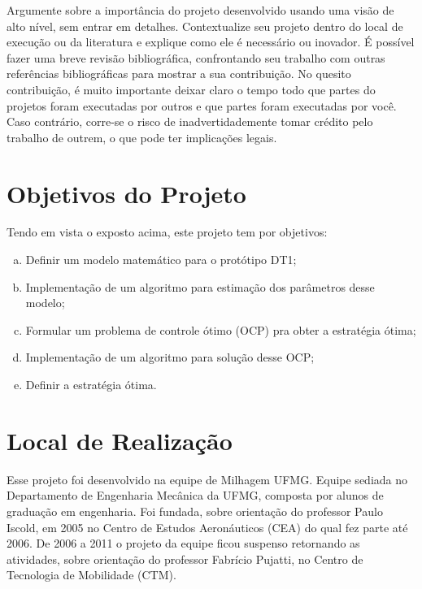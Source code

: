 Argumente sobre a importância do projeto desenvolvido usando uma visão de alto nível, sem entrar em detalhes. Contextualize seu projeto dentro do
local de execução ou da literatura e explique como ele é necessário ou inovador. É possível fazer uma breve revisão bibliográfica, confrontando seu
trabalho com outras referências bibliográficas para mostrar a sua contribuição. No quesito contribuição, é muito importante deixar claro o tempo todo
que partes do projetos foram executadas por outros e que partes foram executadas por você. Caso contrário, corre-se o risco de inadvertidademente
tomar crédito pelo trabalho de outrem, o que pode ter implicações legais.

\section{Objetivos do Projeto}
\label{sec:objetivos}

Tendo em vista o exposto acima, este projeto tem por objetivos:

\begin{enumerate}[a)]
    \item Definir um modelo matemático para o protótipo DT1;
    \item Implementação de um algoritmo para estimação dos parâmetros desse modelo;
    \item Formular um problema de controle ótimo (OCP) pra obter a estratégia ótima;
    \item Implementação de um algoritmo para solução desse OCP;
    \item Definir a estratégia ótima.
\end{enumerate}

\section{Local de Realização}
\label{sec:empresa}

Esse projeto foi desenvolvido na equipe de Milhagem UFMG. Equipe sediada no Departamento de Engenharia Mecânica da UFMG, composta por alunos de graduação em engenharia.
Foi fundada, sobre orientação do
professor Paulo Iscold, em 2005 no Centro de Estudos Aeronáuticos (CEA) do qual fez
parte até 2006.
De 2006 a 2011 o projeto da equipe ficou suspenso retornando as atividades, sobre orientação do professor Fabrício Pujatti, no Centro de Tecnologia
de Mobilidade (CTM).

